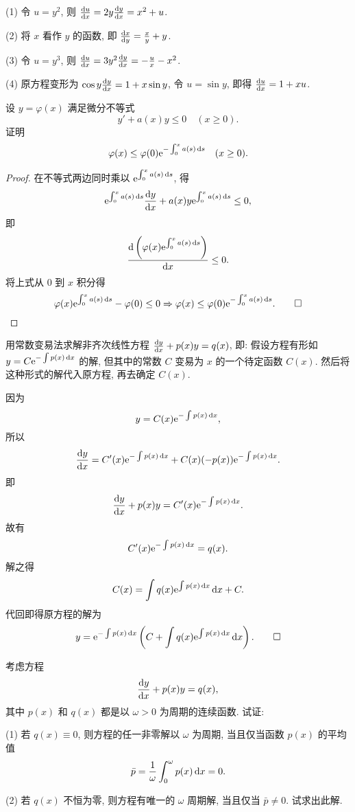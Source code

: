 \begin{solve}
  (1) 令 $u=y^2$, 则 $\frac{\mathop{}\!\mathrm{d} u}{\mathop{}\!\mathrm{d} x}=2y\frac{\mathop{}\!\mathrm{d} y}{\mathop{}\!\mathrm{d} x}=x^2+u$.

  (2) 将 $x$ 看作 $y$ 的函数, 即 $\frac{\mathop{}\!\mathrm{d} x}{\mathop{}\!\mathrm{d} y}=\frac{x}{y}+y$.

  (3) 令 $u=y^3$, 则 $\frac{\mathop{}\!\mathrm{d} u}{\mathop{}\!\mathrm{d} x}=3y^2\frac{\mathop{}\!\mathrm{d} y}{\mathop{}\!\mathrm{d} x}=-\frac{u}{x}-x^2$.

  (4) 原方程变形为 $\cos y\frac{\mathop{}\!\mathrm{d} y}{\mathop{}\!\mathrm{d} x}=1+x\sin y$,
  令 $u=\sin y$, 即得 $\frac{\mathop{}\!\mathrm{d} u}{\mathop{}\!\mathrm{d} x}=1+xu$.
\end{solve}



\begin{exercise}
  设 $y=\varphi(x)$ 满足微分不等式
  \[y'+a(x)y\leq 0\quad (x\geq 0).\]
  证明
  \[\varphi(x)\leq\varphi(0)\mathrm{e}^{-\int_0^x a(s)\mathop{}\!\mathrm{d} s}\quad (x\geq 0).\]
\end{exercise}

\begin{proof} 
在不等式两边同时乘以 $\mathrm{e}^{\int_0^xa(s)\mathop{}\!\mathrm{d} s}$, 得
\[\mathrm{e}^{\int_0^xa(s)\mathop{}\!\mathrm{d} s}\frac{\mathop{}\!\mathrm{d} y}{\mathop{}\!\mathrm{d} x}+a(x)y\mathrm{e}^{\int_0^xa(s)\mathop{}\!\mathrm{d} s}\leq 0,\]
即
\[\frac{\mathop{}\!\mathrm{d}\left(\varphi(x)\mathrm{e}^{\int_0^xa(s)\mathop{}\!\mathrm{d} s}\right)}{\mathop{}\!\mathrm{d} x}\leq 0.\]
将上式从 $0$ 到 $x$ 积分得
\[\varphi(x)\mathrm{e}^{\int_0^xa(s)\mathop{}\!\mathrm{d} s}-\varphi(0)\leq 0
\Rightarrow\varphi(x)\leq\varphi(0)\mathrm{e}^{-\int_0^xa(s)\mathop{}\!\mathrm{d} s}.\qedhere\]
\end{proof}



\begin{exercise}
  用常数变易法求解非齐次线性方程 $\frac{\mathop{}\!\mathrm{d} y}{\mathop{}\!\mathrm{d} x}+p(x)y=q(x)$, 即: 
  假设方程有形如 $y=C\mathrm{e}^{-\int p(x)\mathop{}\!\mathrm{d} x}$ 的解, 但其中的常数 $C$ 变易为 $x$ 的一个待定函数 $C(x)$. 
  然后将这种形式的解代入原方程, 再去确定 $C(x)$.
\end{exercise}

\begin{solve}
因为
\[y=C(x)\mathrm{e}^{-\int p(x)\mathop{}\!\mathrm{d} x},\]
所以
\[\frac{\mathop{}\!\mathrm{d} y}{\mathop{}\!\mathrm{d} x}=C'(x)\mathrm{e}^{-\int p(x)\mathop{}\!\mathrm{d} x}+C(x)(-p(x))\mathrm{e}^{-\int p(x)\mathop{}\!\mathrm{d} x}.\]
即
\[\frac{\mathop{}\!\mathrm{d} y}{\mathop{}\!\mathrm{d} x}+p(x)y=C'(x)\mathrm{e}^{-\int p(x)\mathop{}\!\mathrm{d} x}.\]
故有
\[C'(x)\mathrm{e}^{-\int p(x)\mathop{}\!\mathrm{d} x} = q(x).\]
解之得
\[C(x)=\int q(x)\mathrm{e}^{\int p(x)\mathop{}\!\mathrm{d} x}\mathop{}\!\mathrm{d} x+C.\]
代回即得原方程的解为
\[y=\mathrm{e}^{-\int p(x)\mathop{}\!\mathrm{d} x}\left(C+\int q(x)\mathrm{e}^{\int p(x)\mathop{}\!\mathrm{d} x}\mathop{}\!\mathrm{d} x\right).\qedhere\]
\end{solve}



\begin{exercise}
  考虑方程
  \[\frac{\mathop{}\!\mathrm{d} y}{\mathop{}\!\mathrm{d} x}+p(x)y=q(x),\]
  其中 $p(x)$ 和 $q(x)$ 都是以 $\omega>0$ 为周期的连续函数. 试证:

  (1) 若 $q(x)\equiv 0$, 则方程的任一非零解以 $\omega$ 为周期, 当且仅当函数 $p(x)$ 的平均值
  \[\bar{p}=\frac{1}{\omega}\int_0^{\omega}p(x)\mathop{}\!\mathrm{d} x=0.\]

  (2) 若 $q(x)$ 不恒为零, 则方程有唯一的 $\omega$ 周期解, 当且仅当 $\bar{p}\neq0$. 试求出此解.
\end{exercise}

